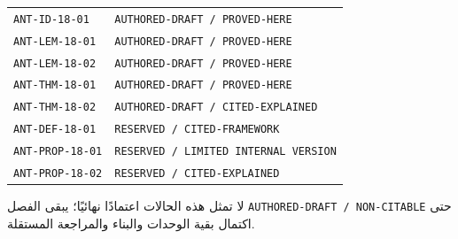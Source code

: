 \begin{center}
\begin{tabular}{ll}
\texttt{ANT-ID-18-01} & \texttt{AUTHORED-DRAFT / PROVED-HERE}\\
\texttt{ANT-LEM-18-01} & \texttt{AUTHORED-DRAFT / PROVED-HERE}\\
\texttt{ANT-LEM-18-02} & \texttt{AUTHORED-DRAFT / PROVED-HERE}\\
\texttt{ANT-THM-18-01} & \texttt{AUTHORED-DRAFT / PROVED-HERE}\\
\texttt{ANT-THM-18-02} & \texttt{AUTHORED-DRAFT / CITED-EXPLAINED}\\
\texttt{ANT-DEF-18-01} & \texttt{RESERVED / CITED-FRAMEWORK}\\
\texttt{ANT-PROP-18-01} & \texttt{RESERVED / LIMITED INTERNAL VERSION}\\
\texttt{ANT-PROP-18-02} & \texttt{RESERVED / CITED-EXPLAINED}
\end{tabular}
\end{center}

لا تمثل هذه الحالات اعتمادًا نهائيًا؛ يبقى الفصل \texttt{AUTHORED-DRAFT / NON-CITABLE} حتى اكتمال بقية الوحدات والبناء والمراجعة المستقلة.
